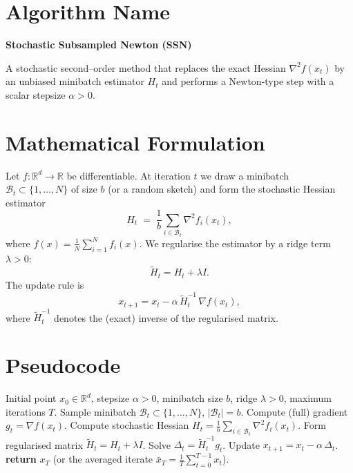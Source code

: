\documentclass{article}
\newcommand{\R}{\mathbb{R}}
\begin{document}
\section*{Algorithm Name}
\textbf{Stochastic Subsampled Newton (SSN)}  

A stochastic second–order method that replaces the exact Hessian $\nabla^{2}f(x_{t})$ by an unbiased minibatch estimator $H_{t}$ and performs a Newton‑type step with a scalar stepsize $\alpha>0$.

\section*{Mathematical Formulation}
Let $f:\R^{d}\rightarrow\R$ be differentiable. At iteration $t$ we draw a minibatch $\mathcal{B}_{t}\subset\{1,\dots,N\}$ of size $b$ (or a random sketch) and form the stochastic Hessian estimator
\[
H_{t}\;=\;\frac{1}{b}\sum_{i\in\mathcal{B}_{t}}\nabla^{2}f_{i}(x_{t}),
\]
where $f(x)=\frac{1}{N}\sum_{i=1}^{N}f_{i}(x)$.  
We regularise the estimator by a ridge term $\lambda>0$:
\[
\tilde H_{t}=H_{t}+\lambda I .
\]
The update rule is
\begin{equation}\label{eq:update}
x_{t+1}=x_{t}-\alpha\,\tilde H_{t}^{-1}\,\nabla f(x_{t}),
\end{equation}
where $\tilde H_{t}^{-1}$ denotes the (exact) inverse of the regularised matrix.

\section*{Pseudocode}
\begin{algorithm}[H]
\caption{Stochastic Subsampled Newton (SSN)}\label{alg:ssn}
\begin{algorithmic}[1]
\Require Initial point $x_{0}\in\R^{d}$, stepsize $\alpha>0$, minibatch size $b$, ridge $\lambda>0$, maximum iterations $T$.
    \State Sample minibatch $\mathcal{B}_{t}\subset\{1,\dots,N\}$, $|\mathcal{B}_{t}|=b$.
    \State Compute (full) gradient $g_{t}= \nabla f(x_{t})$.
    \State Compute stochastic Hessian $H_{t}= \frac{1}{b}\sum_{i\in\mathcal{B}_{t}}\nabla^{2}f_{i}(x_{t})$.
    \State Form regularised matrix $\tilde H_{t}=H_{t}+\lambda I$.
    \State Solve $\Delta_{t}= \tilde H_{t}^{-1} g_{t}$.
    \State Update $x_{t+1}= x_{t}-\alpha\,\Delta_{t}$.
\EndFor
\State \textbf{return} $x_{T}$ (or the averaged iterate $\bar x_{T}= \frac{1}{T}\sum_{t=0}^{T-1}x_{t}$).
\end{algorithmic}
\end{algorithm}
\end{document}
